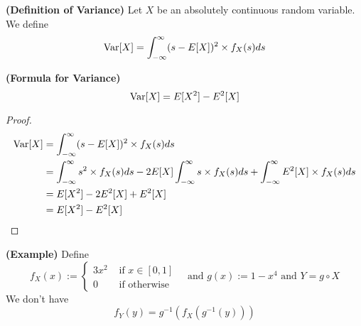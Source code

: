 \documentclass{report}
\begin{document}
\begin{definition}
\label{2.1.9}
\textbf{(Definition of Variance)} Let $X$ be an absolutely continuous random variable. We define
\begin{equation}
\text{Var} [X]=\int^\infty_{-\infty} (s-E[X])^2\times f_X(s)ds
\end{equation}
\end{definition}
\begin{theorem}
\label{2.1.10}
\textbf{(Formula for Variance)}
\begin{equation}
\text{Var} [X]=E[X^2]-E^2[X]
\end{equation}
\end{theorem}
\begin{proof}
\begin{align}
\text{Var} [X]&= \int^\infty_{-\infty}(s-E[X])^2 \times f_X(s)ds\\
&=\int^\infty_{-\infty} s^2 \times f_X(s) ds-2E[X]\int^\infty_{-\infty} s\times f_X(s)ds+\int_{-\infty}^\infty E^2[X]\times f_X(s)ds\\
&=E[X^2]-2E^2[X]+E^2[X]\\
&=E[X^2]-E^2[X]
\end{align}
\end{proof}
\begin{theorem}
\label{2.1.11}
\textbf{(Example)} Define
\begin{equation}
f_X(x):=\begin{cases}
  3x^2& \text{ if $x\in [0,1]$ }\\
  0& \text{ if otherwise }
\end{cases}\text{ and }g(x):=1-x^4\text{ and }Y=g\circ X
\end{equation}
We don't have
\begin{equation}
f_Y(y)=g^{-1}(f_X(g^{-1}(y)))
\end{equation}
\end{theorem}
\end{document}
